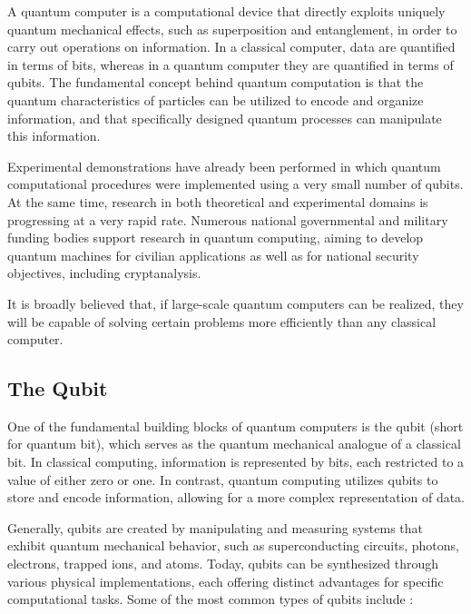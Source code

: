 \documentclass[en]{dimscthesis}
\begin{document}
A quantum computer is a computational device that directly exploits uniquely quantum mechanical effects, such as superposition and entanglement, in order to carry out operations on information. In a classical computer, data are quantified in terms of bits, whereas in a quantum computer they are quantified in terms of qubits. The fundamental concept behind quantum computation is that the quantum characteristics of particles can be utilized to encode and organize information, and that specifically designed quantum processes can manipulate this information.

Experimental demonstrations have already been performed in which quantum computational procedures were implemented using a very small number of qubits. At the same time, research in both theoretical and experimental domains is progressing at a very rapid rate. Numerous national governmental and military funding bodies support research in quantum computing, aiming to develop quantum machines for civilian applications as well as for national security objectives, including cryptanalysis.

It is broadly believed that, if large-scale quantum computers can be realized, they will be capable of solving certain problems more efficiently than any classical computer.

\subsection{The Qubit} \label{qbt}

One of the fundamental building blocks of quantum computers is the qubit (short for quantum bit), which serves as the quantum mechanical analogue of a classical bit. In classical computing, information is represented by bits, each restricted to a value of either zero or one. In contrast, quantum computing utilizes qubits to store and encode information, allowing for a more complex representation of data.

Generally, qubits are created by manipulating and measuring systems that exhibit quantum mechanical behavior, such as superconducting circuits, photons, electrons, trapped ions, and atoms. Today, qubits can be synthesized through various physical implementations, each offering distinct advantages for specific computational tasks. Some of the most common types of qubits include \cite{bib:IBM}:
\end{document}
